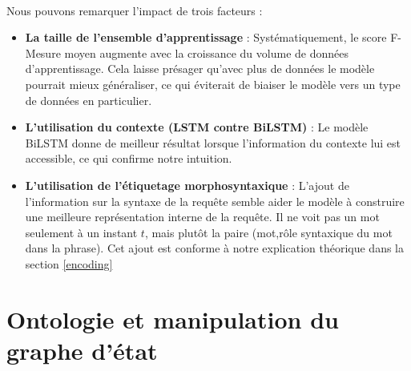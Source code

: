 	\paragraph{}
	Nous pouvons remarquer l'impact de trois facteurs :
	\begin{itemize}
		\item \textbf{La taille de l'ensemble d'apprentissage} : 
		Systématiquement, le score F-Mesure moyen augmente avec la croissance du volume de données d'apprentissage. Cela laisse présager qu'avec plus de données le modèle pourrait mieux généraliser, ce qui éviterait de biaiser le modèle vers un type de données en particulier.
		
		\item \textbf{L'utilisation du contexte (LSTM contre BiLSTM)} : Le modèle BiLSTM donne de meilleur résultat lorsque l'information du contexte lui est accessible, ce qui confirme notre intuition. 
		
		\item \textbf{L'utilisation de l'étiquetage morphosyntaxique} : L'ajout de l'information sur la syntaxe de la requête semble aider le modèle à construire une meilleure représentation interne de la requête. Il ne voit pas un mot seulement à un instant $t$, mais plutôt la paire (mot,rôle syntaxique du mot dans la phrase). Cet ajout est conforme à notre explication théorique dans la section \ref{encoding}
	\end{itemize}
\section{Ontologie et manipulation du graphe d'état}
